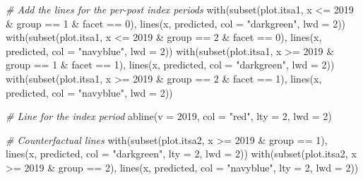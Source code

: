\documentclass[
]{book}
\newenvironment{Shaded}{\begin{snugshade}}{\end{snugshade}}
\newcommand{\AttributeTok}[1]{\textcolor[rgb]{0.77,0.63,0.00}{#1}}
\newcommand{\CommentTok}[1]{\textcolor[rgb]{0.56,0.35,0.01}{\textit{#1}}}
\newcommand{\DecValTok}[1]{\textcolor[rgb]{0.00,0.00,0.81}{#1}}
\newcommand{\FunctionTok}[1]{\textcolor[rgb]{0.00,0.00,0.00}{#1}}
\newcommand{\NormalTok}[1]{#1}
\newcommand{\SpecialCharTok}[1]{\textcolor[rgb]{0.00,0.00,0.00}{#1}}
\newcommand{\StringTok}[1]{\textcolor[rgb]{0.31,0.60,0.02}{#1}}
\begin{document}
\begin{Shaded}
\begin{Highlighting}[]
\CommentTok{\# Add the lines for the per{-}post index periods}
\FunctionTok{with}\NormalTok{(}\FunctionTok{subset}\NormalTok{(plot.itsa1, x }\SpecialCharTok{\textless{}=} \DecValTok{2019} \SpecialCharTok{\&}\NormalTok{ group }\SpecialCharTok{==} \DecValTok{1} \SpecialCharTok{\&}\NormalTok{ facet }\SpecialCharTok{==} \DecValTok{0}\NormalTok{), }\FunctionTok{lines}\NormalTok{(x, predicted, }\AttributeTok{col =} \StringTok{"darkgreen"}\NormalTok{, }\AttributeTok{lwd =} \DecValTok{2}\NormalTok{))}
\FunctionTok{with}\NormalTok{(}\FunctionTok{subset}\NormalTok{(plot.itsa1, x }\SpecialCharTok{\textless{}=} \DecValTok{2019} \SpecialCharTok{\&}\NormalTok{ group }\SpecialCharTok{==} \DecValTok{2} \SpecialCharTok{\&}\NormalTok{ facet }\SpecialCharTok{==} \DecValTok{0}\NormalTok{), }\FunctionTok{lines}\NormalTok{(x, predicted, }\AttributeTok{col =} \StringTok{"navyblue"}\NormalTok{, }\AttributeTok{lwd =} \DecValTok{2}\NormalTok{))}
\FunctionTok{with}\NormalTok{(}\FunctionTok{subset}\NormalTok{(plot.itsa1, x }\SpecialCharTok{\textgreater{}=} \DecValTok{2019} \SpecialCharTok{\&}\NormalTok{ group }\SpecialCharTok{==} \DecValTok{1} \SpecialCharTok{\&}\NormalTok{ facet }\SpecialCharTok{==} \DecValTok{1}\NormalTok{), }\FunctionTok{lines}\NormalTok{(x, predicted, }\AttributeTok{col =} \StringTok{"darkgreen"}\NormalTok{, }\AttributeTok{lwd =} \DecValTok{2}\NormalTok{))}
\FunctionTok{with}\NormalTok{(}\FunctionTok{subset}\NormalTok{(plot.itsa1, x }\SpecialCharTok{\textgreater{}=} \DecValTok{2019} \SpecialCharTok{\&}\NormalTok{ group }\SpecialCharTok{==} \DecValTok{2} \SpecialCharTok{\&}\NormalTok{ facet }\SpecialCharTok{==} \DecValTok{1}\NormalTok{), }\FunctionTok{lines}\NormalTok{(x, predicted, }\AttributeTok{col =} \StringTok{"navyblue"}\NormalTok{, }\AttributeTok{lwd =} \DecValTok{2}\NormalTok{))}

\CommentTok{\# Line for the index period}
\FunctionTok{abline}\NormalTok{(}\AttributeTok{v =} \DecValTok{2019}\NormalTok{, }\AttributeTok{col =} \StringTok{"red"}\NormalTok{, }\AttributeTok{lty =} \DecValTok{2}\NormalTok{, }\AttributeTok{lwd =} \DecValTok{2}\NormalTok{)}

\CommentTok{\# Counterfactual lines}
\FunctionTok{with}\NormalTok{(}\FunctionTok{subset}\NormalTok{(plot.itsa2, x }\SpecialCharTok{\textgreater{}=} \DecValTok{2019} \SpecialCharTok{\&}\NormalTok{ group }\SpecialCharTok{==} \DecValTok{1}\NormalTok{), }\FunctionTok{lines}\NormalTok{(x, predicted, }\AttributeTok{col =} \StringTok{"darkgreen"}\NormalTok{, }\AttributeTok{lty =} \DecValTok{2}\NormalTok{, }\AttributeTok{lwd =} \DecValTok{2}\NormalTok{))}
\FunctionTok{with}\NormalTok{(}\FunctionTok{subset}\NormalTok{(plot.itsa2, x }\SpecialCharTok{\textgreater{}=} \DecValTok{2019} \SpecialCharTok{\&}\NormalTok{ group }\SpecialCharTok{==} \DecValTok{2}\NormalTok{), }\FunctionTok{lines}\NormalTok{(x, predicted, }\AttributeTok{col =} \StringTok{"navyblue"}\NormalTok{, }\AttributeTok{lty =} \DecValTok{2}\NormalTok{, }\AttributeTok{lwd =} \DecValTok{2}\NormalTok{))}
\end{Highlighting}
\end{Shaded}
\end{document}
